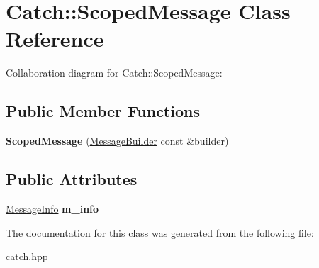 \hypertarget{classCatch_1_1ScopedMessage}{}\section{Catch\+:\+:Scoped\+Message Class Reference}
\label{classCatch_1_1ScopedMessage}


Collaboration diagram for Catch\+:\+:Scoped\+Message\+:
\subsection*{Public Member Functions}
\begin{DoxyCompactItemize}
\item 
{\bfseries Scoped\+Message} (\hyperlink{structCatch_1_1MessageBuilder}{Message\+Builder} const \&builder)\hypertarget{classCatch_1_1ScopedMessage_a5cc59f0f2ebe840e6607f83004d49a17}{}\label{classCatch_1_1ScopedMessage_a5cc59f0f2ebe840e6607f83004d49a17}

\end{DoxyCompactItemize}
\subsection*{Public Attributes}
\begin{DoxyCompactItemize}
\item 
\hyperlink{structCatch_1_1MessageInfo}{Message\+Info} {\bfseries m\+\_\+info}\hypertarget{classCatch_1_1ScopedMessage_ae6e1476f389cc6e1586f033b3747b27b}{}\label{classCatch_1_1ScopedMessage_ae6e1476f389cc6e1586f033b3747b27b}

\end{DoxyCompactItemize}


The documentation for this class was generated from the following file\+:\begin{DoxyCompactItemize}
\item 
catch.\+hpp\end{DoxyCompactItemize}
